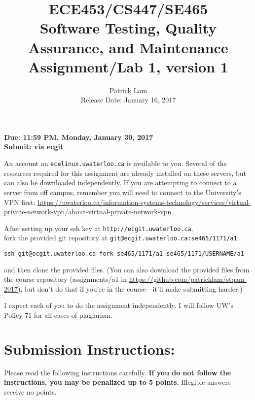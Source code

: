 \documentclass[10pt]{article}
\begin{document}
\title{
ECE453/CS447/SE465 \\
Software Testing, Quality Assurance, and Maintenance\\
Assignment/Lab 1, version 1}
\author{Patrick Lam \\
{Release Date:  January 16, 2017} \\
}
\renewcommand{\today}{}
\maketitle

\begin{center}



{\bf Due:  11:59 PM, Monday, January 30, 2017} \\
{\bf Submit: via ecgit }\\
\end{center}


An account on {\tt ecelinux.uwaterloo.ca} is available to you.
Several of the resources required for this assignment are already installed on these servers, but can also be downloaded independently.
If you are attempting to connect to a server from off campus, remember you will need to connect to the University's VPN first: \url{https://uwaterloo.ca/information-systems-technology/services/virtual-private-network-vpn/about-virtual-private-network-vpn}

After setting up your ssh key at {\tt http://ecgit.uwaterloo.ca}, \\ fork the provided git repository at {\tt git@ecgit.uwaterloo.ca:se465/1171/a1}:

\begin{center}
{\tt ssh git@ecgit.uwaterloo.ca fork se465/1171/a1 se465/1171/USERNAME/a1}
\end{center}

\noindent and then clone the provided files. 
(You can also download the provided
files from the course repository (assignments/a1 in \url{https://github.com/patricklam/stqam-2017}),
but don't do that if you're in the course---it'll make submitting harder.)

I expect each of you to do the assignment independently. I will follow UW's Policy 71 for all cases of plagiarism.
 
 \section*{Submission Instructions:} 
 Please read the following instructions carefully. {\bf If you do not follow the instructions, you may be 
penalized up to 5 points. } Illegible answers receive no points.
 
\end{document}
